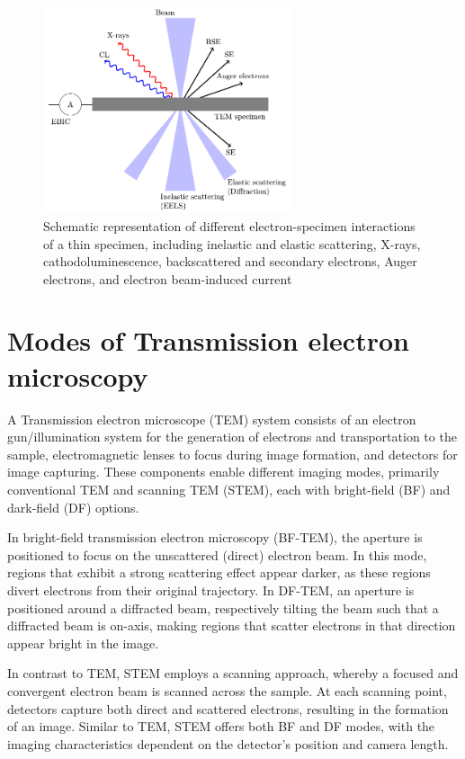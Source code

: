 \begin{figure}[ht]
    \centering
    \includegraphics[width=0.65\textwidth]{Introduction/figures/electronww.pdf}
    \caption[Schematic representation of different electron-specimen interactions]{Schematic representation of different electron-specimen interactions of a thin specimen, including inelastic and elastic scattering, X-rays, cathodoluminescence, backscattered and secondary electrons, Auger electrons, and electron beam-induced current}
    \label{fig:electronww}
\end{figure}


\section{Modes of Transmission electron microscopy}

A Transmission electron microscope (TEM) system consists of an electron gun/illumination system for the generation of electrons and transportation to the sample, electromagnetic lenses to focus during image formation, and detectors for image capturing. 
These components enable different imaging modes, primarily conventional TEM and scanning TEM (STEM), each with bright-field (BF) and dark-field (DF) options.
\par In bright-field transmission electron microscopy (BF-TEM), the aperture is positioned to focus on the unscattered (direct) electron beam. 
In this mode, regions that exhibit a strong scattering effect appear darker, as these regions divert electrons from their original trajectory.
In DF-TEM, an aperture is positioned around a diffracted beam, respectively tilting the beam such that a diffracted beam is on-axis, making regions that scatter electrons in that direction appear bright in the image.
\par In contrast to TEM, STEM employs a scanning approach, whereby a focused and convergent electron beam is scanned across the sample.
At each scanning point, detectors capture both direct and scattered electrons, resulting in the formation of an image.
Similar to TEM, STEM offers both BF and DF modes, with the imaging characteristics dependent on the detector's position and camera length.


